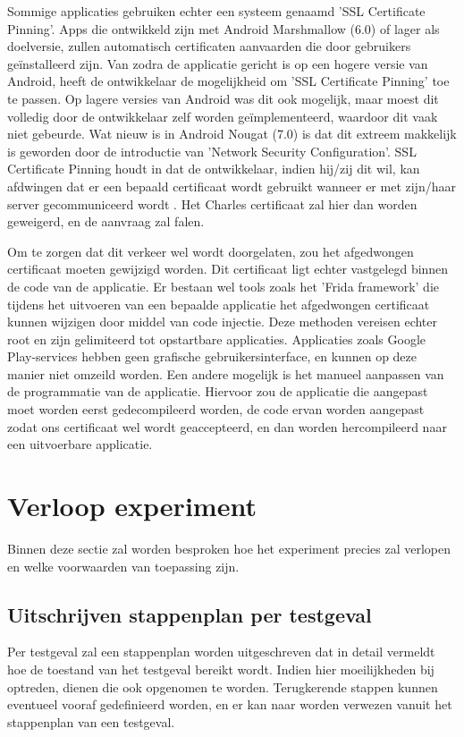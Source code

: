 Sommige applicaties gebruiken echter een systeem genaamd 'SSL Certificate Pinning'.  Apps die ontwikkeld zijn met Android Marshmallow (6.0) of lager als doelversie, zullen automatisch certificaten aanvaarden die door gebruikers geïnstalleerd zijn. Van zodra de applicatie gericht is op een hogere versie van Android, heeft de ontwikkelaar de mogelijkheid om 'SSL Certificate Pinning' toe te passen. Op lagere versies van Android was dit ook mogelijk, maar moest dit volledig door de ontwikkelaar zelf worden geïmplementeerd, waardoor dit vaak niet gebeurde. Wat nieuw is in Android Nougat (7.0) is dat dit extreem makkelijk is geworden door de introductie van 'Network Security Configuration'. SSL Certificate Pinning houdt in dat de ontwikkelaar, indien hij/zij dit wil, kan afdwingen dat er een bepaald certificaat wordt gebruikt wanneer er met zijn/haar server gecommuniceerd wordt  \autocite{wass_ssl-pinning}. Het Charles certificaat zal hier dan worden geweigerd, en de aanvraag zal falen.

Om te zorgen dat dit verkeer wel wordt doorgelaten, zou het  afgedwongen certificaat moeten gewijzigd worden. Dit certificaat ligt echter vastgelegd binnen de code van de applicatie. Er bestaan wel tools zoals het 'Frida framework' die tijdens het uitvoeren van een bepaalde applicatie het afgedwongen certificaat kunnen wijzigen door middel van code injectie. Deze methoden vereisen echter root en zijn gelimiteerd tot opstartbare applicaties. Applicaties zoals Google Play-services hebben geen grafische gebruikersinterface, en kunnen op deze manier niet omzeild worden. Een andere mogelijk is het manueel aanpassen van de programmatie van de applicatie. Hiervoor zou de applicatie die aangepast moet worden eerst gedecompileerd worden, de code ervan worden aangepast zodat ons certificaat wel wordt geaccepteerd, en dan worden hercompileerd naar een uitvoerbare applicatie. 

\section{Verloop experiment}
\label{sec:conditionsexperiment}
Binnen deze sectie zal worden besproken hoe het experiment precies zal verlopen en welke voorwaarden van toepassing zijn.

\subsection{Uitschrijven stappenplan per testgeval}
Per testgeval zal een stappenplan worden uitgeschreven dat in detail vermeldt hoe de toestand van het testgeval bereikt wordt. Indien hier moeilijkheden bij optreden, dienen die ook opgenomen te worden. Terugkerende stappen kunnen eventueel vooraf gedefinieerd worden, en er kan naar worden verwezen vanuit het stappenplan van een testgeval.

